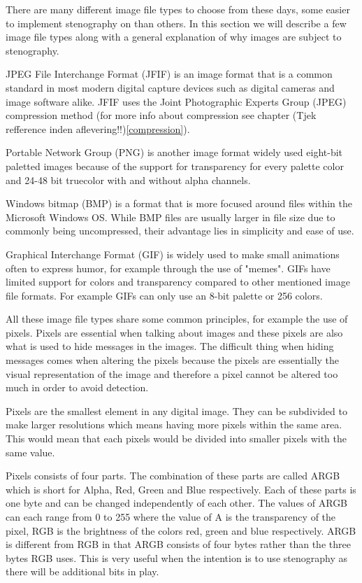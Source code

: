 There are many different image file types to choose from these days, some easier to implement stenography on than others. In this section we will describe a few image file types along with a general explanation of why images are subject to stenography.

JPEG File Interchange Format (JFIF) is an image format that is a common standard in most modern digital capture devices such as digital cameras and image software alike. JFIF uses the Joint Photographic Experts Group (JPEG) compression method (for more info about compression see chapter (Tjek refference inden aflevering!!)\ref{compression}).

Portable Network Group (PNG) is another image format widely used eight-bit paletted images because of the support for transparency for every palette color and 24-48 bit truecolor with and without alpha channels.

Windows bitmap (BMP) is a format that is more focused around files within the Microsoft Windows OS. While BMP files are usually larger in file size due to commonly being uncompressed, their advantage lies in simplicity and ease of use.

Graphical Interchange Format (GIF) is widely used to make small animations often to express humor, for example through the use of "memes". GIFs have limited support for colors and transparency compared to other mentioned image file formats. For example GIFs can only use an 8-bit palette or 256 colors.

All these image file types share some common principles, for example the use of pixels. Pixels are essential when talking about images and these pixels are also what is used to hide messages in the images. The difficult thing when hiding messages comes when altering the pixels because the pixels are essentially the visual representation of the image and therefore a pixel cannot be altered too much in order to avoid detection.

Pixels are the smallest element in any digital image. They can be subdivided to make larger resolutions which means having more pixels within the same area. This would mean that each pixels would be divided into smaller pixels with the same value.\cite{ThePixel}

Pixels consists of four parts. The combination of these parts are called ARGB which is short for Alpha, Red, Green and Blue respectively. Each of these parts is one byte and can be changed independently of each other. The values of ARGB can each range from 0 to 255 where the value of A is the transparency of the pixel, RGB is the brightness of the colors red, green and blue respectively. ARGB is different from RGB in that ARGB consists of four bytes rather than the three bytes RGB uses.\cite{ARGB}
This is very useful when the intention is to use stenography as there will be additional bits in play.